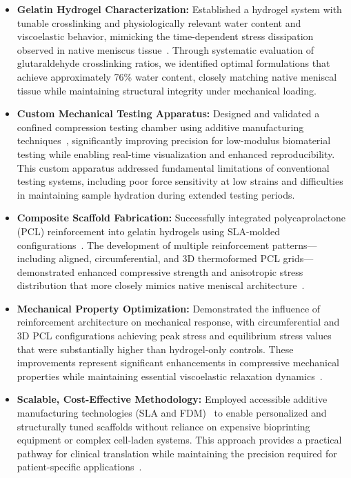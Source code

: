 \begin{itemize}
    \item \textbf{Gelatin Hydrogel Characterization:} Established a hydrogel system with tunable crosslinking and physiologically relevant water content and viscoelastic behavior, mimicking the time-dependent stress dissipation observed in native meniscus tissue~\cite{bulle2021humanmeniscus}. Through systematic evaluation of glutaraldehyde crosslinking ratios, we identified optimal formulations that achieve approximately 76\% water content, closely matching native meniscal tissue while maintaining structural integrity under mechanical loading.
    
    \item \textbf{Custom Mechanical Testing Apparatus:} Designed and validated a confined compression testing chamber using additive manufacturing techniques~\cite{elkommos2024developmentimproved}, significantly improving precision for low-modulus biomaterial testing while enabling real-time visualization and enhanced reproducibility. This custom apparatus addressed fundamental limitations of conventional testing systems, including poor force sensitivity at low strains and difficulties in maintaining sample hydration during extended testing periods.
    
    \item \textbf{Composite Scaffold Fabrication:} Successfully integrated polycaprolactone (PCL) reinforcement into gelatin hydrogels using SLA-molded configurations~\cite{elkommos2025hybridhydrogels}. The development of multiple reinforcement patterns—including aligned, circumferential, and 3D thermoformed PCL grids—demonstrated enhanced compressive strength and anisotropic stress distribution that more closely mimics native meniscal architecture~\cite{abdelgaied2015comparisonbiomechanical}.
    
    \item \textbf{Mechanical Property Optimization:} Demonstrated the influence of reinforcement architecture on mechanical response, with circumferential and 3D PCL configurations achieving peak stress and equilibrium stress values that were substantially higher than hydrogel-only controls. These improvements represent significant enhancements in compressive mechanical properties while maintaining essential viscoelastic relaxation dynamics~\cite{bulle2021humanmeniscus}.
    
    \item \textbf{Scalable, Cost-Effective Methodology:} Employed accessible additive manufacturing technologies (SLA and FDM)~\cite{ngo2018additivemanufacturing} to enable personalized and structurally tuned scaffolds without reliance on expensive bioprinting equipment or complex cell-laden systems. This approach provides a practical pathway for clinical translation while maintaining the precision required for patient-specific applications~\cite{filardo2019patientspecificmeniscus}.
\end{itemize}

